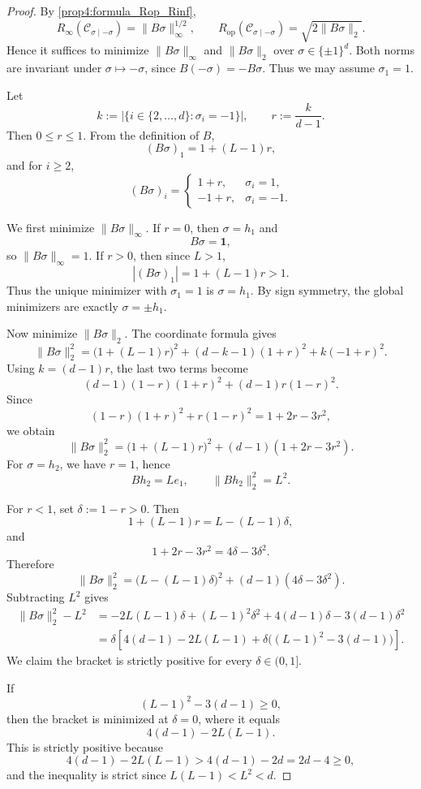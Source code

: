 \documentclass[10pt,a4paper]{amsart}
\begin{document}
\begin{proof}
By \cref{prop4:formula_Rop_Rinf},
\[
R_\infty(\mathcal C_{\sigma\mid-\sigma})
=
\|B\sigma\|_\infty^{1/2},
\qquad
R_{\mathrm{op}}(\mathcal C_{\sigma\mid-\sigma})
=
\sqrt{2\|B\sigma\|_2}.
\]
Hence it suffices to minimize $\|B\sigma\|_\infty$ and $\|B\sigma\|_2$ over
$\sigma\in\{\pm1\}^d$.
Both norms are invariant under $\sigma\mapsto-\sigma$, since
$B(-\sigma)=-B\sigma$. Thus we may assume $\sigma_1=1$.

Let
\[
k:=|\{i\in\{2,\dots,d\}:\sigma_i=-1\}|,
\qquad
r:=\frac{k}{d-1}.
\]
Then $0\le r\le1$. From the definition of $B$,
\[
(B\sigma)_1=1+(L-1)r,
\]
and for $i\ge2$,
\[
(B\sigma)_i=
\begin{cases}
1+r, & \sigma_i=1,\\
-1+r, & \sigma_i=-1.
\end{cases}
\]

We first minimize $\|B\sigma\|_\infty$. If $r=0$, then $\sigma=h_1$ and
\[
B\sigma=\mathbf 1,
\]
so $\|B\sigma\|_\infty=1$. If $r>0$, then since $L>1$,
\[
|(B\sigma)_1|=1+(L-1)r>1.
\]
Thus the unique minimizer with $\sigma_1=1$ is $\sigma=h_1$. By sign symmetry,
the global minimizers are exactly $\sigma=\pm h_1$.

Now minimize $\|B\sigma\|_2$. The coordinate formula gives
\[
\|B\sigma\|_2^2
=
\bigl(1+(L-1)r\bigr)^2
+
(d-k-1)(1+r)^2
+
k(-1+r)^2.
\]
Using $k=(d-1)r$, the last two terms become
\[
(d-1)(1-r)(1+r)^2+(d-1)r(1-r)^2.
\]
Since
\[
(1-r)(1+r)^2+r(1-r)^2
=
1+2r-3r^2,
\]
we obtain
\[
\|B\sigma\|_2^2
=
\bigl(1+(L-1)r\bigr)^2
+
(d-1)(1+2r-3r^2).
\]
For $\sigma=h_2$, we have $r=1$, hence
\[
Bh_2=Le_1,
\qquad
\|Bh_2\|_2^2=L^2.
\]

For $r<1$, set $\delta:=1-r>0$. Then
\[
1+(L-1)r
=
L-(L-1)\delta,
\]
and
\[
1+2r-3r^2
=
4\delta-3\delta^2.
\]
Therefore
\[
\|B\sigma\|_2^2
=
\bigl(L-(L-1)\delta\bigr)^2
+
(d-1)(4\delta-3\delta^2).
\]
Subtracting $L^2$ gives
\[
\begin{aligned}
\|B\sigma\|_2^2-L^2
&=
-2L(L-1)\delta
+
(L-1)^2\delta^2
+
4(d-1)\delta
-
3(d-1)\delta^2
\\
&=
\delta
\left[
4(d-1)-2L(L-1)
+
\delta\bigl((L-1)^2-3(d-1)\bigr)
\right].
\end{aligned}
\]
We claim the bracket is strictly positive for every $\delta\in(0,1]$.

If
\[
(L-1)^2-3(d-1)\ge0,
\]
then the bracket is minimized at $\delta=0$, where it equals
\[
4(d-1)-2L(L-1).
\]
This is strictly positive because
\[
4(d-1)-2L(L-1)
>
4(d-1)-2d
=
2d-4
\ge0,
\]
and the inequality is strict since $L(L-1)<L^2<d$.


\end{proof}
\end{document}
